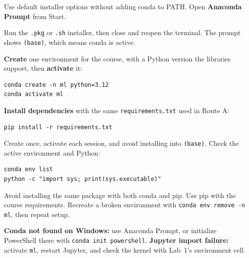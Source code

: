 \begin{description}[leftmargin=1.15in,style=nextline]
  \item[Windows] Use default installer options without adding conda to PATH. Open \textbf{Anaconda Prompt} from Start.
  \item[macOS / Linux] Run the \texttt{.pkg} or \texttt{.sh} installer, then close and reopen the terminal. The prompt shows \texttt{(base)}, which means conda is active.
\end{description}

\textbf{Create} one environment for the course, with a Python version the libraries support, then \textbf{activate} it:

\begin{lstlisting}[style=utpterminal]
conda create -n ml python=3.12
conda activate ml
\end{lstlisting}

\textbf{Install dependencies} with the same \texttt{requirements.txt} used in Route A:

\begin{lstlisting}[style=utpterminal]
pip install -r requirements.txt
\end{lstlisting}

Create once, activate each session, and avoid installing into \texttt{(base)}. Check the active environment and Python:

\begin{lstlisting}[style=utpterminal]
conda env list
python -c "import sys; print(sys.executable)"
\end{lstlisting}

\begin{pitfall}
Avoid installing the same package with both conda and pip. Use pip with the course requirements. Recreate a broken environment with \texttt{conda env remove -n ml}, then repeat setup.
\end{pitfall}

\begin{troubleshoot}
\textbf{Conda not found on Windows:} use Anaconda Prompt, or initialize PowerShell there with \texttt{conda init powershell}. \textbf{Jupyter import failure:} activate \texttt{ml}, restart Jupyter, and check the kernel with Lab~1's environment cell.
\end{troubleshoot}